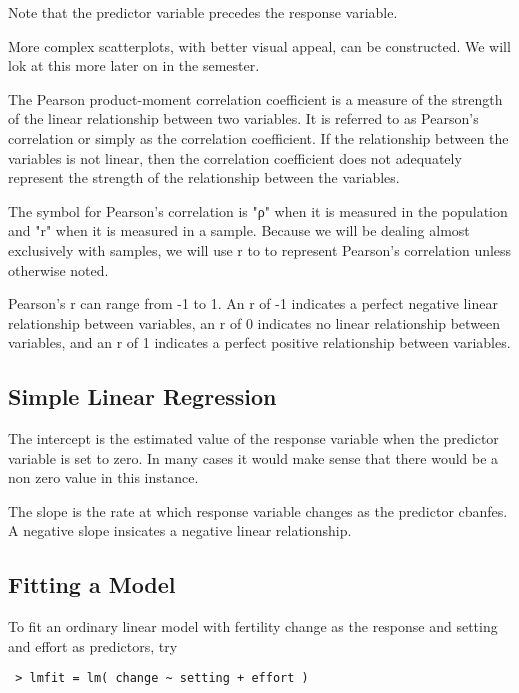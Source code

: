 Note that the predictor variable precedes the response variable.

More complex scatterplots, with better visual appeal, can be constructed. We will lok at this more later on in the semester.


The Pearson product-moment correlation coefficient is a measure of the strength of the linear relationship between two variables. It is referred to as Pearson's correlation or simply as the correlation coefficient. If the relationship between the variables is not linear, then the correlation coefficient does not adequately represent the strength of the relationship between the variables.

The symbol for Pearson's correlation is "ρ" when it is measured in the population and "r" when it is measured in a sample. Because we will be dealing almost exclusively with samples, we will use r to to represent Pearson's correlation unless otherwise noted.

Pearson's r can range from -1 to 1. An r of -1 indicates a perfect negative linear relationship between variables, an r of 0 indicates no linear relationship between variables, and an r of 1 indicates a perfect positive relationship between variables. 



\subsection{Simple Linear Regression}


The intercept is the estimated value of the response variable when the predictor variable is set to zero. In many cases it would make sense that there would be a non zero value in this instance.

The slope is the rate at which response variable changes as the predictor cbanfes. A negative slope insicates a negative linear relationship.

\subsection{Fitting a Model}

 To fit an ordinary linear model with fertility change as the response and setting and effort as predictors, try

\begin{framed}
\begin{verbatim}
 > lmfit = lm( change ~ setting + effort )
\end{verbatim}
\end{framed}

